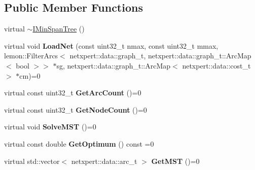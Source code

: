 \subsection*{Public Member Functions}
\begin{DoxyCompactItemize}
\item 
virtual \hyperlink{classnetxpert_1_1core_1_1IMinSpanTree_a6179745c4e3b91c1cc4260ff43a40a07}{$\sim$\+I\+Min\+Span\+Tree} ()
\item 
virtual void {\bfseries Load\+Net} (const uint32\+\_\+t nmax, const uint32\+\_\+t mmax, lemon\+::\+Filter\+Arcs$<$ netxpert\+::data\+::graph\+\_\+t, netxpert\+::data\+::graph\+\_\+t\+::\+Arc\+Map$<$ bool $>$$>$ $\ast$sg, netxpert\+::data\+::graph\+\_\+t\+::\+Arc\+Map$<$ netxpert\+::data\+::cost\+\_\+t $>$ $\ast$cm)=0\hypertarget{classnetxpert_1_1core_1_1IMinSpanTree_afe3b59f776882e4b645fb53f2000a363}{}\label{classnetxpert_1_1core_1_1IMinSpanTree_afe3b59f776882e4b645fb53f2000a363}

\item 
virtual const uint32\+\_\+t {\bfseries Get\+Arc\+Count} ()=0\hypertarget{classnetxpert_1_1core_1_1IMinSpanTree_ae4b36350ca156e0d1f507c6c6acb1e71}{}\label{classnetxpert_1_1core_1_1IMinSpanTree_ae4b36350ca156e0d1f507c6c6acb1e71}

\item 
virtual const uint32\+\_\+t {\bfseries Get\+Node\+Count} ()=0\hypertarget{classnetxpert_1_1core_1_1IMinSpanTree_aaf79eb23e96a7dc1030c88298a800f98}{}\label{classnetxpert_1_1core_1_1IMinSpanTree_aaf79eb23e96a7dc1030c88298a800f98}

\item 
virtual void {\bfseries Solve\+M\+ST} ()=0\hypertarget{classnetxpert_1_1core_1_1IMinSpanTree_af1f5ddfaed28ad881c376746fd448e58}{}\label{classnetxpert_1_1core_1_1IMinSpanTree_af1f5ddfaed28ad881c376746fd448e58}

\item 
virtual const double {\bfseries Get\+Optimum} () const =0\hypertarget{classnetxpert_1_1core_1_1IMinSpanTree_a3c5b7486449a768eccb92ac1bc7ee446}{}\label{classnetxpert_1_1core_1_1IMinSpanTree_a3c5b7486449a768eccb92ac1bc7ee446}

\item 
virtual std\+::vector$<$ netxpert\+::data\+::arc\+\_\+t $>$ {\bfseries Get\+M\+ST} ()=0\hypertarget{classnetxpert_1_1core_1_1IMinSpanTree_a0c31d5383b3a26be340db74d543c8d88}{}\label{classnetxpert_1_1core_1_1IMinSpanTree_a0c31d5383b3a26be340db74d543c8d88}

\end{DoxyCompactItemize}


